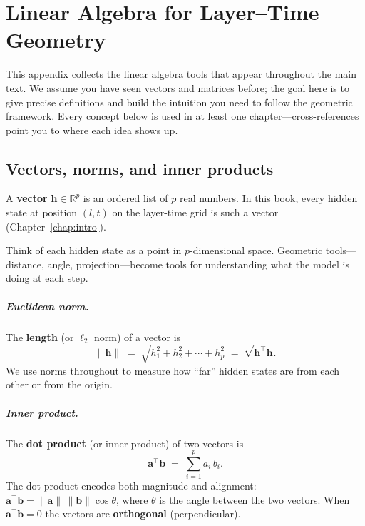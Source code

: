 \documentclass[11pt, twoside, openright]{memoir}
\begin{document}

\chapter{Linear Algebra for Layer--Time Geometry}
\label{app:linear-algebra}


This appendix collects the linear algebra tools that appear throughout the
main text.  We assume you have seen vectors and matrices before; the goal
here is to give precise definitions and build the intuition you need to
follow the geometric framework.  Every concept below is used in at least one
chapter---cross-references point you to where each idea shows up.

\section{Vectors, norms, and inner products}

A \textbf{vector} $\mathbf{h} \in \mathbb{R}^p$ is an ordered list of $p$
real numbers.  In this book, every hidden state at position $(l, t)$ on the
layer-time grid is such a vector (Chapter~\ref{chap:intro}).

\begin{keyidea}
Think of each hidden state as a point in $p$-dimensional space.  Geometric
tools---distance, angle, projection---become tools for understanding what
the model is doing at each step.
\end{keyidea}

\paragraph{Euclidean norm.}
The \textbf{length} (or $\ell_2$ norm) of a vector is
\[
  \|\mathbf{h}\| \;=\; \sqrt{h_1^2 + h_2^2 + \cdots + h_p^2}
  \;=\; \sqrt{\mathbf{h}^\top \mathbf{h}}.
\]
We use norms throughout to measure how ``far'' hidden states are from each
other or from the origin.

\paragraph{Inner product.}
The \textbf{dot product} (or inner product) of two vectors is
\[
  \mathbf{a}^\top \mathbf{b} \;=\; \sum_{i=1}^{p} a_i \, b_i.
\]
The dot product encodes both magnitude and alignment:
$\mathbf{a}^\top \mathbf{b} = \|\mathbf{a}\|\,\|\mathbf{b}\|\cos\theta$,
where $\theta$ is the angle between the two vectors.  When
$\mathbf{a}^\top\mathbf{b} = 0$ the vectors are \textbf{orthogonal}
(perpendicular).
\end{document}
